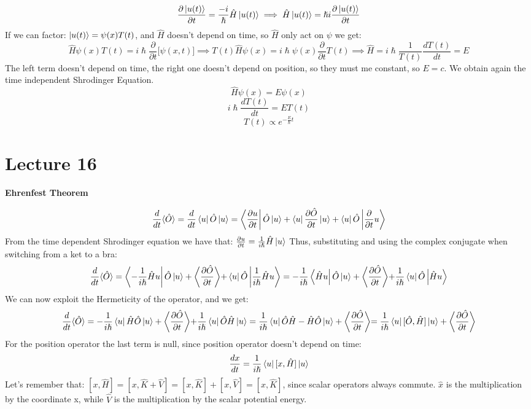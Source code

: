 \documentclass{article}
\begin{document}
$$\frac{ \partial \ket{u(t)}}{\partial t} = \frac{-i}{\hslash}\hat{H}\ket{u(t)} \implies \hat{H} \ket{u(t)} = \hslash i \frac{\partial \ket{u(t)}}{\partial t}$$
If we can factor: $\ket{u(t)} = \psi(x) T(t)$, and $\hat{H}$ doesn't depend on time, so $\hat{H}$ only act on $\psi$  we get:
$$\hat{H}\psi(x) T(t) = i \hslash \frac{\partial}{\partial t} \bigl[ \psi(x,t) \bigl] \implies T(t) \hat{H}\psi(x) = i \hslash \psi(x) \frac{\partial}{\partial t} T(t) \implies \hat{H} = i \hslash \frac{1}{T(t)} \frac{d T(t)}{dt} = E$$
The left term doesn't depend on time, the right one doesn't depend on position, so they must me constant, so $E=c$.
We obtain again the time independent Shrodinger Equation.
$$\hat{H}\psi(x) = E \psi(x)$$
$$i \hslash \frac{dT(t)}{dt} = E T(t)$$
$$T(t) \varpropto e^{-\frac{E}{\hslash}t}$$

\section{Lecture 16}
\textbf{Ehrenfest Theorem}

$$\frac{d}{dt} \langle \hat{O} \rangle = \frac{d}{dt} \bra{u} \hat{O} \ket{u} = \bra{\frac{\partial u}{\partial t}} \hat{O} \ket{u} + \bra{u} \frac{\partial \hat{O}}{\partial t} \ket{u} + \bra{u} \hat{O} \ket{\frac{\partial }{\partial t}u}$$
From the time dependent Shrodinger equation we have that: $\frac{\partial u}{\partial t} = \frac{1}{i\hslash} \hat{H}\ket{u} $
Thus, substituting and using the complex conjugate when switching from a ket to a bra:
$$\frac{d}{dt} \langle \hat{O} \rangle = \bra{-\frac{1}{i\hslash} \hat{H} u} \hat{O} \ket{u} + \biggl\langle \frac{\partial \hat{O}}{\partial t} \biggl\rangle + \bra{u} \hat{O} \ket{\frac{1}{i\hslash} \hat{H} u}  = -\frac{1}{i\hslash}  \bra{\hat{H} u} \hat{O} \ket{u} + \biggl\langle \frac{\partial \hat{O}}{\partial t} \biggl\rangle + \frac{1}{i\hslash} \bra{u} \hat{O}  \ket{\hat{H} u} 
$$
We can now exploit the Hermeticity of the operator, and we get:
$$\frac{d}{dt} \langle \hat{O} \rangle = -\frac{1}{i\hslash}  \bra{ u} \hat{H}\hat{O} \ket{u} + \biggl\langle \frac{\partial \hat{O}}{\partial t} \biggl\rangle + \frac{1}{i\hslash} \bra{u} \hat{O} \hat{H} \ket{u} = \frac{1}{i\hslash} \bra{u} \hat{O}\hat{H}- \hat{H}\hat{O} \ket{u} + \biggl\langle \frac{\partial \hat{O}}{\partial t} \biggl\rangle = \frac{1}{i\hslash}\bra{u}[\hat{O}, \hat{H}] \ket{u} +  \biggl\langle \frac{\partial \hat{O}}{\partial t} \biggl\rangle $$
For the position operator the last term is null, since position operator doesn't depend on time:
$$\frac{dx}{dt} =  \frac{1}{i\hslash}\bra{u}[x, \hat{H}] \ket{u}$$
Let's remember that:
$[x,\hat{H}] = [x, \hat{K}+ \hat{V}] = [x,\hat{K}]+ [x, \hat{V}] = [x,\hat{K}] $, since  scalar operators always commute. $\hat{x}$ is the multiplication by the coordinate x, while $\hat{V}$ is the multiplication by the scalar potential energy.
\end{document}
